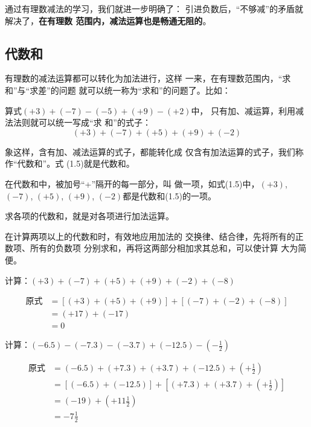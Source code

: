 通过有理数减法的学习，我们就进一步明确了：
引进负数后，“不够减”的矛盾就解决了，\textbf{在有理数
	范围内，减法运算也是畅通无阻的}。


\subsection{代数和}
有理数的减法运算都可以转化为加法进行，这样
一来，在有理数范围内，“求和”与“求差”的问题
就可以统一称为“求和”的问题了。比如：

算式$(+ 3)+(-7)-(-5)+(+9)-(+2)$中，
只有加、减运算，利用减法法则就可以统一写成“求
和”的式子：
\begin{equation}
(+ 3)+(-7)+(+5)+(+9)+(-2)
\end{equation}

象这样，含有加、减法运算的式子，都能转化成
仅含有加法运算的式子，我们称作“代数和”。式
(1.5)就是代数和。

在代数和中，被加号“+”隔开的每一部分，叫
做一项，如式(1.5)中，$(+3)$, $(-7)$, $(+ 5)$,
$(+9)$, $(-2)$都是代数和(1.5)的一项。

求各项的代数和，就是对各项进行加法运算。

在计算两项以上的代数和时，有效地应用加法的
交换律、结合律，先将所有的正数项、所有的负数项
分别求和，再将这两部分相加求其总和，可以使计算
大为简便。

\begin{example}
	计算：$(+3)+(-7)+(+5)+(+9)+(-2)+(-8)$
\end{example}

\begin{solution}
	\begin{align*}
	\text{原式}&= [(+3)+(+5)+(+9)]+[(-7)+(-2)+(-8)] \tag{交换、结合律}\\
	&=(+17)+(-17) \tag{同号加法法则}\\
	&=0 \tag{相反数的特性}
	\end{align*}
\end{solution}

\begin{example}
	计算：$(-6.5)-(-7.3)-(-3.7)+(-12.5)-\left(-\frac{1}{2}\right)$
\end{example}

\begin{solution}
	\begin{align*}
	\text{原式}&= (-6.5)+(+7.3)+(+3.7)+(-12.5)+\left(+\frac{1}{2}\right) \tag{减法法则}\\
	&=[(-6.5)+(-12.5)]+\left[(+7.3)+(+3.7)+\left(+\frac{1}{2}\right)\right] \tag{交换、结合律}\\
	&=(-19)+\left(+11\frac{1}{2}\right) \tag{同号相加法则}\\
	&=-7\frac{1}{2} \tag{异号相加法则}
	\end{align*}
\end{solution}

